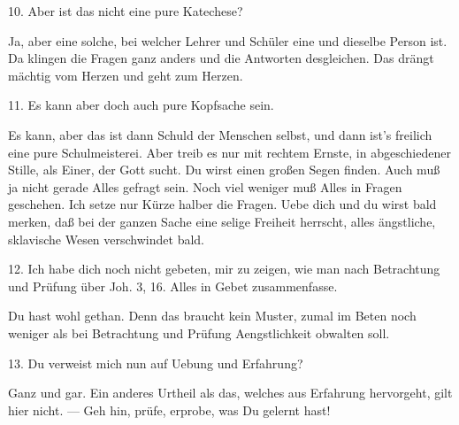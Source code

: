 10. Aber ist das nicht eine pure Katechese?

Ja, aber eine solche, bei welcher Lehrer und Schüler eine und dieselbe Person ist. Da klingen die Fragen ganz anders und die Antworten desgleichen. Das drängt mächtig vom Herzen und geht zum Herzen.

11. Es kann aber doch auch pure Kopfsache sein.

Es kann, aber das ist dann Schuld der Menschen selbst, und dann ist’s freilich eine pure Schulmeisterei. Aber treib es nur mit rechtem Ernste, in abgeschiedener Stille, als Einer, der Gott sucht. Du wirst einen großen Segen finden. Auch muß ja nicht gerade Alles gefragt sein. Noch viel weniger muß Alles in Fragen geschehen. Ich setze nur Kürze halber die Fragen. Uebe dich und du wirst bald merken, daß bei der ganzen Sache eine selige Freiheit herrscht, alles ängstliche, sklavische Wesen verschwindet bald.

12. Ich habe dich noch nicht gebeten, mir zu zeigen, wie
man nach Betrachtung und Prüfung über Joh. 3, 16. Alles in Gebet zusammenfasse.

Du hast wohl gethan. Denn das braucht kein Muster, zumal im Beten noch weniger als bei Betrachtung und Prüfung Aengstlichkeit obwalten soll.

13. Du verweist mich nun auf Uebung und Erfahrung?

Ganz und gar. Ein anderes Urtheil als das, welches aus Erfahrung hervorgeht, gilt hier nicht. — Geh hin, prüfe, erprobe, was Du gelernt hast!

